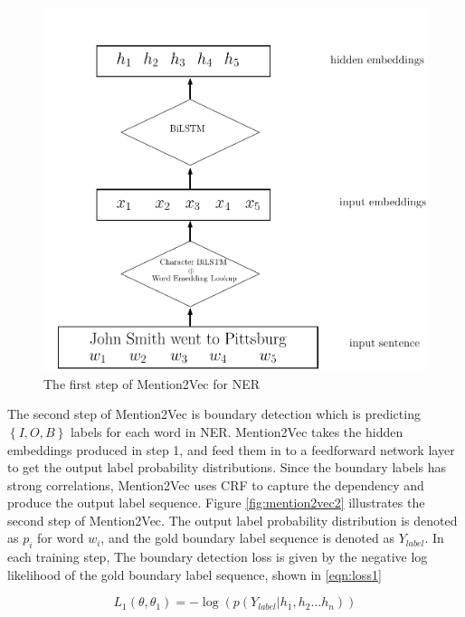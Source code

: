 \documentclass{sfuthesis}
\begin{document}
\begin{figure}
  \centering
  \includegraphics[scale=0.6]{mention2vec1.pdf}
 \caption{The first step of Mention2Vec for NER}
  \label{fig:mention2vec1}
\end{figure}


The second step of Mention2Vec is boundary detection which is predicting $\left\{I, O, B\right\}$ labels for each word in NER. Mention2Vec takes the hidden embeddings produced in step 1, and feed them in to a feedforward network layer to get the output label probability distributions. Since the boundary labels has strong correlations, Mention2Vec uses CRF to capture the dependency and produce the output label sequence. Figure \ref{fig:mention2vec2} illustrates the second step of Mention2Vec. The output label probability distribution is denoted as $p_{i}$ for word $w_{i}$, and the gold boundary label sequence is denoted as $Y_{label}$. In each training step, The boundary detection loss is given by the negative log likelihood of the gold boundary label sequence, shown in \ref{eqn:loss1}

\begin{equation}\label{eqn:loss1}
  L_{1}\left( \theta ,\theta _{1}\right) =-\log \left( p\left( Y_{label}|h_{1}, h_{2} \dots h_{n}\right) \right) 
\end{equation}
\end{document}
